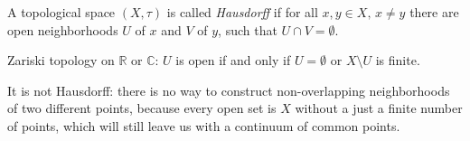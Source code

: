\begin{definition}
    A topological space $(X, \tau)$ is called \textit{Hausdorff}
    if for all $x, y \in X,\, x \ne y$ there are open neighborhoods
    $U$ of $x$ and $V$ of $y$, such that $U \cap V = \emptyset$.
\end{definition}
\begin{example}
    Zariski topology on $\mathbb{R}$ or $\mathbb{C}$:
    $U$ is open if and only if $U = \emptyset$ or $X \setminus U$ is finite.

    It is not Hausdorff: there is no way to construct non-overlapping neighborhoods
    of two different points, because every open set is $X$ without a just a finite number of points,
    which will still leave us with a continuum of common points.
\end{example}

